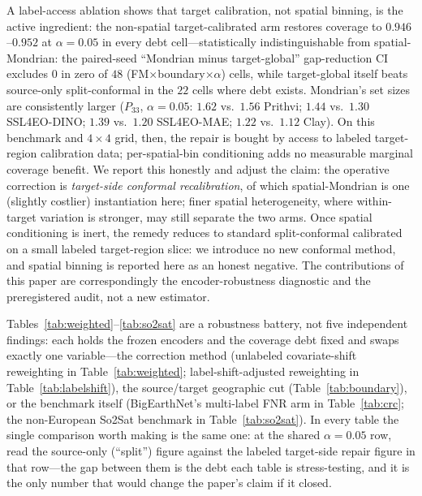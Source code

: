 \documentclass[journal]{IEEEtran}
\renewcommand{\_}{\textunderscore\allowbreak}
\begin{document}
A label-access ablation shows that target calibration, not spatial binning, is the active ingredient: the
non-spatial target-calibrated arm restores coverage to $0.946$--$0.952$ at $\alpha=0.05$ in every debt
cell---statistically indistinguishable from spatial-Mondrian: the paired-seed ``Mondrian minus
target-global'' gap-reduction CI excludes $0$ in zero of $48$ (FM$\times$boundary$\times\alpha$)
cells, while target-global itself beats source-only split-conformal in the $22$ cells where debt exists.
Mondrian's set sizes are consistently larger ($P_{33}$, $\alpha=0.05$: $1.62$ vs.\ $1.56$ Prithvi;
$1.44$ vs.\ $1.30$ SSL4EO-DINO; $1.39$ vs.\ $1.20$ SSL4EO-MAE; $1.22$ vs.\ $1.12$ Clay). On this benchmark
and $4\times4$ grid, then, the repair is bought by access to labeled target-region calibration data;
per-spatial-bin conditioning adds no measurable marginal coverage benefit. We report this honestly and
adjust the claim: the operative correction is \emph{target-side conformal recalibration}, of which
spatial-Mondrian is one (slightly costlier) instantiation here; finer spatial heterogeneity, where
within-target variation is stronger, may still separate the two arms. Once spatial conditioning is inert,
the remedy reduces to standard split-conformal calibrated on a small labeled target-region slice: we
introduce no new conformal method, and spatial binning is reported here as an honest negative. The
contributions of this paper are correspondingly the encoder-robustness diagnostic and the
preregistered audit, not a new estimator.

Tables~\ref{tab:weighted}--\ref{tab:so2sat} are a robustness battery, not five independent findings: each
holds the frozen encoders and the coverage debt fixed and swaps exactly one variable---the correction
method (unlabeled covariate-shift reweighting in Table~\ref{tab:weighted}; label-shift-adjusted
reweighting in Table~\ref{tab:labelshift}), the source/target geographic cut (Table~\ref{tab:boundary}),
or the benchmark itself (BigEarthNet's multi-label FNR arm in Table~\ref{tab:crc}; the non-European
So2Sat benchmark in Table~\ref{tab:so2sat}). In every table the single comparison worth making is the
same one: at the shared $\alpha=0.05$ row, read the source-only (``split'') figure against the labeled
target-side repair figure in that row---the gap between them is the debt each table is stress-testing,
and it is the only number that would change the paper's claim if it closed.
\end{document}
